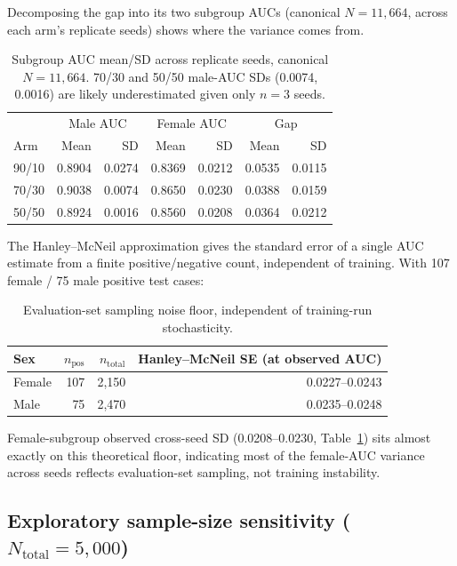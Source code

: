 \documentclass[11pt]{article}
\begin{document}
Decomposing the gap into its two subgroup AUCs (canonical $N=11{,}664$, across each arm's replicate seeds) shows where the variance comes from.

\begin{table}[H]
\centering
\begin{tabular}{lrrrrrr}
\toprule
& \multicolumn{2}{c}{Male AUC} & \multicolumn{2}{c}{Female AUC} & \multicolumn{2}{c}{Gap} \\
Arm & Mean & SD & Mean & SD & Mean & SD \\
\midrule
90/10 & 0.8904 & 0.0274 & 0.8369 & 0.0212 & 0.0535 & 0.0115 \\
70/30 & 0.9038 & 0.0074 & 0.8650 & 0.0230 & 0.0388 & 0.0159 \\
50/50 & 0.8924 & 0.0016 & 0.8560 & 0.0208 & 0.0364 & 0.0212 \\
\bottomrule
\end{tabular}
\caption{Subgroup AUC mean/SD across replicate seeds, canonical $N=11{,}664$. 70/30 and 50/50 male-AUC SDs (0.0074, 0.0016) are likely underestimated given only $n=3$ seeds.}
\label{tab:decomp}
\end{table}

The Hanley--McNeil approximation gives the standard error of a single AUC estimate from a finite positive/negative count, independent of training. With 107 female / 75 male positive test cases:

\begin{table}[H]
\centering
\begin{tabular}{lrrr}
\toprule
Sex & $n_{\text{pos}}$ & $n_{\text{total}}$ & Hanley--McNeil SE (at observed AUC) \\
\midrule
Female & 107 & 2{,}150 & 0.0227--0.0243 \\
Male & 75 & 2{,}470 & 0.0235--0.0248 \\
\bottomrule
\end{tabular}
\caption{Evaluation-set sampling noise floor, independent of training-run stochasticity.}
\label{tab:hanley}
\end{table}

Female-subgroup observed cross-seed SD (0.0208--0.0230, Table~\ref{tab:decomp}) sits almost exactly on this theoretical floor, indicating most of the female-AUC variance across seeds reflects evaluation-set sampling, not training instability.

\subsection{Exploratory sample-size sensitivity ($N_{\text{total}}=5{,}000$)}
\end{document}
